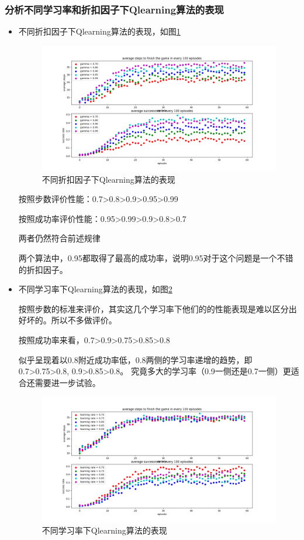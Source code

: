 \documentclass{article}
\begin{document}
\subsubsection*{分析不同学习率和折扣因子下Qlearning算法的表现}
\begin{itemize}
\item 
不同折扣因子下Qlearning算法的表现，如图\ref{fig:3}
\begin{figure}[htbp]
	\centering
	\includegraphics[scale=0.5]{Img/Qlearning_gamma.png}
	\caption{不同折扣因子下Qlearning算法的表现}\label{fig:3}
\end{figure}

按照步数评价性能：0.7>0.8>0.9>0.95>0.99

按照成功率评价性能：0.95>0.99>0.9>0.8>0.7

两者仍然符合前述规律

两个算法中，0.95都取得了最高的成功率，说明0.95对于这个问题是一个不错的折扣因子。

\item 
不同学习率下Qlearning算法的表现，如图\ref{fig:4}

按照步数的标准来评价，其实这几个学习率下他们的的性能表现是难以区分出好坏的。所以不多做评价。

按照成功率来看，0.7>0.9>0.75>0.85>0.8

似乎呈现着以0.8附近成功率低，0.8两侧的学习率递增的趋势，即 0.7>0.75>0.8, 0.9>0.85>0.8。
究竟多大的学习率（0.9一侧还是0.7一侧）更适合还需要进一步试验。

\clearpage
\begin{figure}[htbp]
	\centering
	\includegraphics[scale=0.5]{Img/Qlearning_lr.png}
	\caption{不同学习率下Qlearning算法的表现}\label{fig:4}
\end{figure}
\end{itemize}
\end{document}
